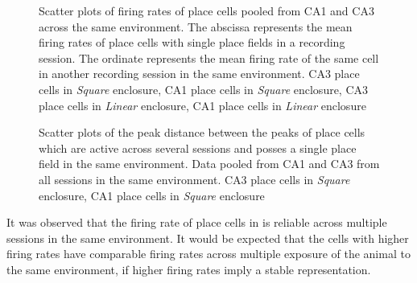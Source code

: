 \begin{figure}[htb!]
\centering
{}

\label{fig:rateremapping}
\caption[Rate Remapping]{Scatter plots of firing rates of place cells pooled from CA1 and CA3  across the same environment. The abscissa represents the mean firing rates of place cells with single place fields in a recording session. The ordinate represents the mean firing rate of the same cell in another recording session in the same environment.  CA3 place cells in \emph{Square} enclosure,  CA1 place cells in \emph{Square} enclosure,  CA3 place cells in \emph{Linear} enclosure,  CA1 place cells in \emph{Linear} enclosure}
\end{figure}



\begin{figure}[htb!]
\centering
{}

\label{fig:pkDist}
\caption[Place field Peak distances]{Scatter plots of the peak distance between the peaks of place cells which are active across several sessions and posses a single place field in the same environment. Data pooled from CA1 and CA3  from all sessions in the same environment.   CA3 place cells in \emph{Square} enclosure,  CA1 place cells in \emph{Square} enclosure} %
\end{figure}
It was observed that the firing rate of place cells in is reliable across multiple sessions in the same environment. It would be expected that the cells with higher firing rates have comparable firing rates across multiple exposure of the animal to the same environment, if higher firing rates imply a stable representation. 

